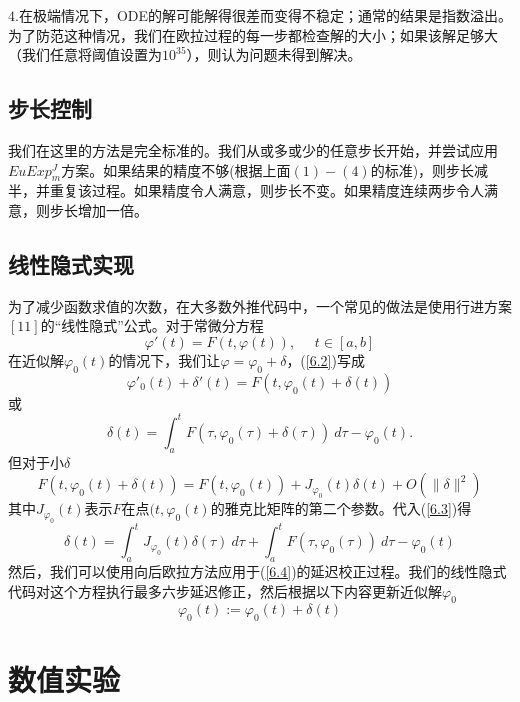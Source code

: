 \documentclass[12pt,a4paper]{article}
\begin{document}
$4$.在极端情况下，ODE的解可能解得很差而变得不稳定；通常的结果是指数溢出。为了防范这种情况，我们在欧拉过程的每一步都检查解的大小；如果该解足够大（我们任意将阈值设置为$10^{35}$），则认为问题未得到解决。\\
\subsection{步长控制}

我们在这里的方法是完全标准的。我们从或多或少的任意步长开始，并尝试应用$EuExp^J_m$方案。如果结果的精度不够(根据上面$(1)-(4)$的标准)，则步长减半，并重复该过程。如果精度令人满意，则步长不变。如果精度连续两步令人满意，则步长增加一倍。\\
\subsection{线性隐式实现}

为了减少函数求值的次数，在大多数外推代码中，一个常见的做法是使用行进方案$[11]$的“线性隐式”公式。对于常微分方程\\
\begin{equation}
\varphi'(t)=F(t,\varphi(t)),~~~~~~t \in [a,b]
\label{6.2}
\end{equation}
在近似解$\varphi_0(t)$的情况下，我们让$\varphi=\varphi_0+\delta$，(\ref{6.2})写成\\
$$\varphi'_0(t)+\delta'(t)=F(t,\varphi_0(t)+\delta(t))$$
或\\
\begin{equation}
\delta(t)=\int_a^t F(\tau,\varphi_0(\tau)+\delta(\tau))~d\tau-\varphi_0(t).
\label{6.3}
\end{equation}
但对于小$\delta$\\
$$F(t,\varphi_0(t)+\delta(t))=F(t,\varphi_0(t))+J_{\varphi_0}(t) \delta(t)+O(\| \delta \|^2)$$
其中$J_{\varphi_0}(t)$表示$F$在点$(t,\varphi_0(t)$的雅克比矩阵的第二个参数。代入(\ref{6.3})得\\
\begin{equation}
\label{6.4}
\delta(t)=\int_a^t J_{\varphi_0}(t)\delta(\tau)~d\tau+ \int_a^t F(\tau,\varphi_0(\tau))~d\tau-\varphi_0(t)
\end{equation}
然后，我们可以使用向后欧拉方法应用于(\ref{6.4})的延迟校正过程。我们的线性隐式代码对这个方程执行最多六步延迟修正，然后根据以下内容更新近似解$\varphi_0$\\
$$\varphi_0(t) := \varphi_0(t)+\delta(t)$$
\section{数值实验}
\end{document}
